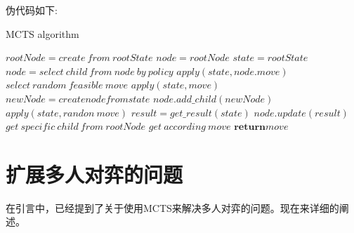 \documentclass[9pt,twocolumn,twoside]{osajnl}
\begin{document}
伪代码如下:
\begin{algorithm}
	\caption{MCTS algorithm}\label{alg:MCTS}
	\begin{algorithmic}[1]
		\State $rootNode = create \ from \ rootState $
		\State $node = rootNode$
		\State $state = rootState$
		\State $node = select \ child \ from \ node \ by \ policy$
		\State $apply(state,node.move)$ 
		\EndWhile
		\State $select \ random \ feasible \ move$
		\State $apply(state,move)$
		\State $newNode = create node from state$
		\State $node.add\_child(newNode)$ 
		\State $apply(state, randon \ move)$ 
		\EndWhile
		\State $result = get\_result(state)$
		\State $node.update(result)$
		\EndWhile
		\EndWhile
		\State $get \ specific \ child \ from \ rootNode$
		\State $get \ according \ move$
		\State $\textbf{return} move$
		\EndProcedure
	\end{algorithmic}
\end{algorithm}

\section{扩展多人对弈的问题}
在引言中，已经提到了关于使用MCTS来解决多人对弈的问题。现在来详细的阐述。
\end{document}
